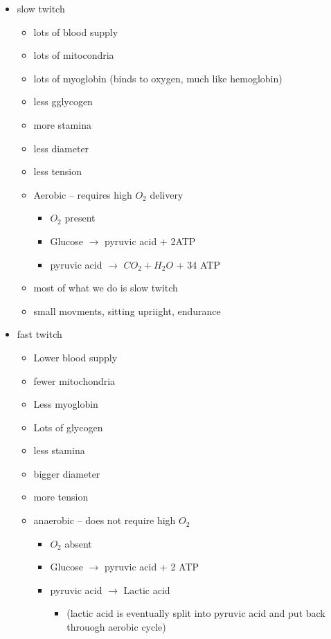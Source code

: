\documentclass{article}
\theoremstyle{definition}
\begin{document}
\begin{itemize}
\begin{itemize}
			\item slow twitch
				\begin{itemize}
					\item lots of blood supply
					\item lots of mitocondria
					\item lots of myoglobin (binds to oxygen, much like hemoglobin)
					\item less gglycogen
					\item more stamina
					\item less diameter
					\item less tension
					\item Aerobic -- requires high $O_2$ delivery
						\begin{itemize}
							\item $O_2$ present
							\item Glucose $\to$ pyruvic acid + 2ATP
							\item pyruvic acid $\to$ $CO_2 + H_2O$ + 34 ATP
						\end{itemize}
					\item most of what we do is slow twitch
					\item small movments, sitting upriight, endurance
				\end{itemize}
			\item fast twitch
				\begin{itemize}
					\item Lower blood supply
					\item fewer mitochondria
					\item Less myoglobin
					\item Lots of glycogen
					\item less stamina
					\item bigger diameter
					\item more tension
					\item anaerobic -- does not require high $O_2$
						\begin{itemize}
							\item $O_2$ absent
							\item Glucose $\to$ pyruvic acid + 2 ATP
							\item pyruvic acid $\to$ Lactic acid
								\begin{itemize}
									\item (lactic acid is eventually split into pyruvic acid and put back throuogh aerobic cycle)
								\end{itemize}
						\end{itemize}

\end{itemize}
\end{itemize}
\end{itemize}
\end{document}
